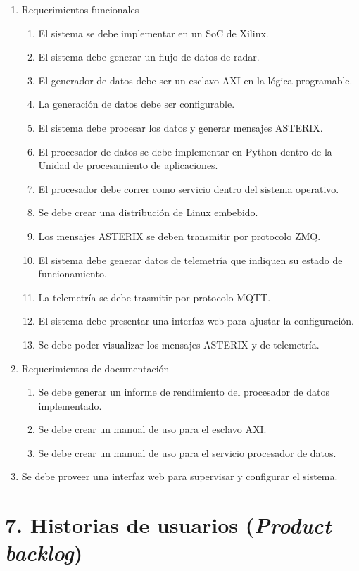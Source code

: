 \documentclass[
11pt, %
]{charter}
\begin{document}
\begin{enumerate}
	\item Requerimientos funcionales
		\begin{enumerate}
      \item El sistema se debe implementar en un SoC de Xilinx.
      \item El sistema debe generar un flujo de datos de radar.
      \item El generador de datos debe ser un esclavo AXI en la lógica programable.
			\item La generación de datos debe ser configurable.
			\item El sistema debe procesar los datos y generar mensajes ASTERIX.
      \item El procesador de datos se debe implementar en Python dentro de la
        Unidad de procesamiento de aplicaciones.
      \item El procesador debe correr como servicio dentro del sistema
        operativo.
      \item Se debe crear una distribución de Linux embebido.
			\item Los mensajes ASTERIX se deben transmitir por protocolo ZMQ.
			\item El sistema debe generar datos de telemetría que indiquen su estado
        de funcionamiento.
			\item La telemetría se debe trasmitir por protocolo MQTT.
			\item El sistema debe presentar una interfaz web para ajustar la
        configuración.
      \item Se debe poder visualizar los mensajes ASTERIX y de telemetría.
		\end{enumerate}
	\item Requerimientos de documentación
		\begin{enumerate}
			\item Se debe generar un informe de rendimiento del procesador de datos implementado.
			\item Se debe crear un manual de uso para el esclavo AXI.
      \item Se debe crear un manual de uso para el servicio procesador de datos.
		\end{enumerate}
	\item Se debe proveer una interfaz web para supervisar y configurar el sistema.
\end{enumerate}

\section{7. Historias de usuarios (\textit{Product backlog})}
\label{sec:backlog}
\end{document}
